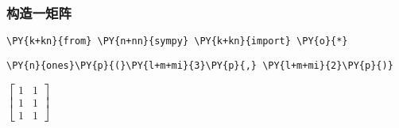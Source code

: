     \hypertarget{ux6784ux9020ux4e00ux77e9ux9635}{%
\subsubsection{构造一矩阵}\label{ux6784ux9020ux4e00ux77e9ux9635}}

    \begin{tcolorbox}[breakable, size=fbox, boxrule=1pt, pad at break*=1mm,colback=cellbackground, colframe=cellborder]
\begin{Verbatim}[commandchars=\\\{\}]
\PY{k+kn}{from} \PY{n+nn}{sympy} \PY{k+kn}{import} \PY{o}{*}
\end{Verbatim}
\end{tcolorbox}

    \begin{tcolorbox}[breakable, size=fbox, boxrule=1pt, pad at break*=1mm,colback=cellbackground, colframe=cellborder]
\begin{Verbatim}[commandchars=\\\{\}]
\PY{n}{ones}\PY{p}{(}\PY{l+m+mi}{3}\PY{p}{,} \PY{l+m+mi}{2}\PY{p}{)}
\end{Verbatim}
\end{tcolorbox}
 
            
    
    $\displaystyle \left[\begin{matrix}1 & 1\\1 & 1\\1 & 1\end{matrix}\right]$
